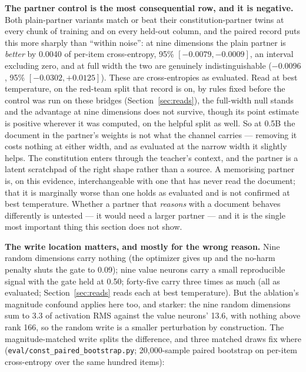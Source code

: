 \documentclass[11pt]{article}
\newcommand{\code}[1]{\texttt{#1}}
\begin{document}
\textbf{The partner control is the most consequential row, and it is negative.} Both plain-partner variants match or beat their constitution-partner twins at every chunk of training and on every held-out column, and the paired record puts this more sharply than ``within noise'': at nine dimensions the plain partner is \emph{better} by 0.0040 of per-item cross-entropy, 95\% $[-0.0079, -0.0009]$, an interval excluding zero, and at full width the two are genuinely indistinguishable ($-0.0096$, 95\% $[-0.0302, +0.0125]$). These are cross-entropies as evaluated. Read at best temperature, on the red-team split that record is on, by rules fixed before the control was run on these bridges (Section~\ref{sec:reads}), the full-width null stands and the advantage at nine dimensions does not survive, though its point estimate is positive wherever it was computed, on the helpful split as well. So at 0.5B the document in the partner's weights is not what the channel carries --- removing it costs nothing at either width, and as evaluated at the narrow width it slightly helps. The constitution enters through the teacher's context, and the partner is a latent scratchpad of the right shape rather than a source. A memorising partner is, on this evidence, interchangeable with one that has never read the document; that it is marginally worse than one holds as evaluated and is not confirmed at best temperature. Whether a partner that \emph{reasons} with a document behaves differently is untested --- it would need a larger partner --- and it is the single most important thing this section does not show.

\textbf{The write location matters, and mostly for the wrong reason.} Nine random dimensions carry nothing (the optimizer gives up and the no-harm penalty shuts the gate to 0.09); nine value neurons carry a small reproducible signal with the gate held at 0.50; forty-five carry three times as much (all as evaluated; Section~\ref{sec:reads} reads each at best temperature). But the ablation's magnitude confound applies here too, and starker: the nine random dimensions sum to 3.3 of activation RMS against the value neurons' 13.6, with nothing above rank 166, so the random write is a smaller perturbation by construction. The magnitude-matched write splits the difference, and three matched draws fix where (\code{eval/const\_paired\_bootstrap.py}; 20,000-sample paired bootstrap on per-item cross-entropy over the same hundred items):
\end{document}
